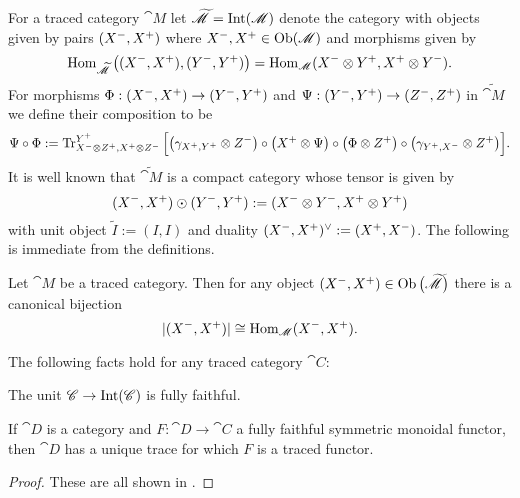 \documentclass[12pt,oneside,article,draft]{memoir}
\begin{document}
For a traced category $\cat{M}$ let $\widetilde{\mathscr{M}}=\operatorname{Int}(\mathscr{M})$ denote the category with objects given by pairs $(X^-,X^+)$ where $X^-,X^+\in \operatorname{Ob}(\mathscr{M})$ and morphisms given by 
\[\operatorname{Hom}_{\widetilde{\mathscr{M}}}\big((X^-,X^+),(Y^-,Y^+)\big)=\operatorname{Hom}_{\mathscr{M}}(X^-\otimes Y^+,X^+\otimes Y^-).\]
For morphisms $\Phi:(X^-,X^+)\to(Y^-,Y^+)$ and $\Psi:(Y^-,Y^+)\to(Z^-,Z^+)$ in $\widetilde{\cat{M}}$ we define their composition to be
\[\Psi\circ\Phi:=\operatorname{Tr}^{Y^+}_{X^-\otimes Z^+,X^+\otimes Z^-}\Big[\big(\gamma_{X^+,Y^+}\otimes Z^-\big)\circ\big(X^+\otimes\Psi\big)\circ\big(\Phi\otimes Z^+\big)\circ\big(\gamma_{Y^+,X^-}\otimes Z^+\big)\Big].\]
It is well known that $\widetilde{\cat{M}}$ is a compact  category whose tensor is given by
\[(X^-,X^+)\odot(Y^-,Y^+):=(X^-\otimes Y^-,X^+\otimes Y^+)\]
with unit object $\tilde I:=(I,I)$ and duality $(X^-,X^+)^\vee:=(X^+,X^-)$.  The following is immediate from the definitions.

\begin{lemma}

Let $\cat{M}$ be a traced category.  Then for any object $(X^-,X^+)\in\operatorname{Ob}\big(\widetilde{\mathscr{M}}\big)$ there is a canonical bijection
\[|(X^-,X^+)|\cong\operatorname{Hom}_{\mathscr{M}}(X^-,X^+).\]

\end{lemma}


\begin{lemma}\label{lemma:fully faithful and trace}
The following facts hold for any traced category $\cat{C}$:
\begin{compactitem}
	\item The unit $\mathscr{C}\to\operatorname{Int}(\mathscr{C})$ is fully faithful.
	\item If $\cat{D}$ is a category and $F\colon\cat{D}\to\cat{C}$ a fully faithful symmetric monoidal functor, then $\cat{D}$ has a unique trace for which $F$ is a traced functor.
\end{compactitem}
\end{lemma}

\begin{proof}

These are all shown in \cite{Joyal-Street-Verity}.

\end{proof}
\end{document}
